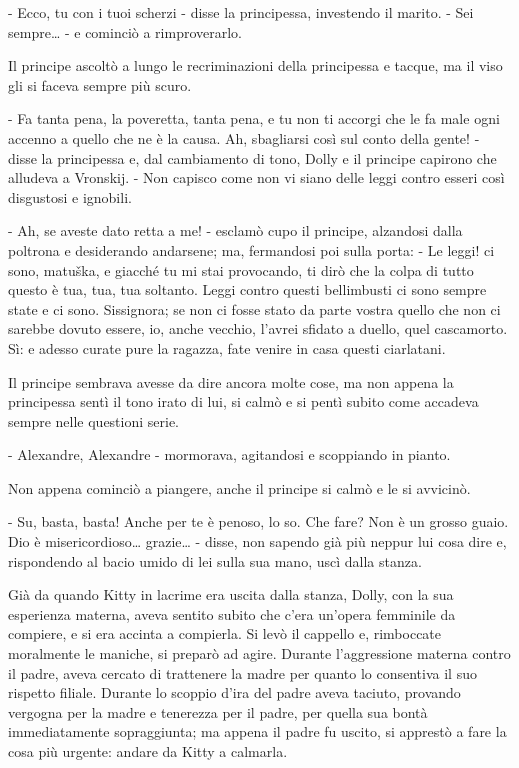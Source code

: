 - Ecco, tu con i tuoi scherzi - disse la principessa, investendo il marito. - Sei sempre\ldots{} - e cominciò a rimproverarlo. 

Il principe ascoltò a lungo le recriminazioni della principessa e tacque, ma il viso gli si faceva sempre più scuro. 

- Fa tanta pena, la poveretta, tanta pena, e tu non ti accorgi che le fa male ogni accenno a quello che ne è la causa. Ah, sbagliarsi così sul conto della gente! - disse la principessa e, dal cambiamento di tono, Dolly e il principe capirono che alludeva a Vronskij. - Non capisco come non vi siano delle leggi contro esseri così disgustosi e ignobili. 

- Ah, se aveste dato retta a me! - esclamò cupo il principe, alzandosi dalla poltrona e desiderando andarsene; ma, fermandosi poi sulla porta: - Le leggi! ci sono, matuška, e giacché tu mi stai provocando, ti dirò che la colpa di tutto questo è tua, tua, tua soltanto. Leggi contro questi bellimbusti ci sono sempre state e ci sono. Sissignora; se non ci fosse stato da parte vostra quello che non ci sarebbe dovuto essere, io, anche vecchio, l'avrei sfidato a duello, quel cascamorto. Sì: e adesso curate pure la ragazza, fate venire in casa questi ciarlatani. 

Il principe sembrava avesse da dire ancora molte cose, ma non appena la principessa sentì il tono irato di lui, si calmò e si pentì subito come accadeva sempre nelle questioni serie. 

- Alexandre, Alexandre - mormorava, agitandosi e scoppiando in pianto. 

Non appena cominciò a piangere, anche il principe si calmò e le si avvicinò. 

- Su, basta, basta! Anche per te è penoso, lo so. Che fare? Non è un grosso guaio. Dio è misericordioso\ldots{} grazie\ldots{} - disse, non sapendo già più neppur lui cosa dire e, rispondendo al bacio umido di lei sulla sua mano, uscì dalla stanza. 

Già da quando Kitty in lacrime era uscita dalla stanza, Dolly, con la sua esperienza materna, aveva sentito subito che c'era un'opera femminile da compiere, e si era accinta a compierla. Si levò il cappello e, rimboccate moralmente le maniche, si preparò ad agire. Durante l'aggressione materna contro il padre, aveva cercato di trattenere la madre per quanto lo consentiva il suo rispetto filiale. Durante lo scoppio d'ira del padre aveva taciuto, provando vergogna per la madre e tenerezza per il padre, per quella sua bontà immediatamente sopraggiunta; ma appena il padre fu uscito, si apprestò a fare la cosa più urgente: andare da Kitty a calmarla. 

